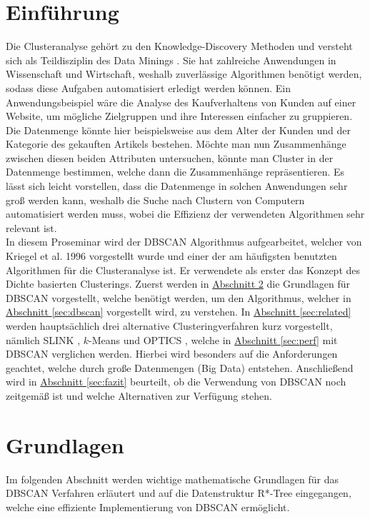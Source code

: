 \documentclass{lni}
\begin{document}
\section{Einführung}
Die Clusteranalyse gehört zu den Knowledge-Discovery Methoden und versteht sich als Teildisziplin des Data Minings \cite{BIGDATA}. Sie hat zahlreiche Anwendungen in Wissenschaft und Wirtschaft, weshalb zuverlässige Algorithmen benötigt werden, sodass diese Aufgaben automatisiert erledigt werden können. Ein Anwendungsbeispiel wäre die Analyse des Kaufverhaltens von Kunden auf einer Website, um mögliche Zielgruppen und ihre Interessen einfacher zu gruppieren. Die Datenmenge könnte hier beispielsweise aus dem Alter der Kunden und der Kategorie des gekauften Artikels bestehen. Möchte man nun Zusammenhänge zwischen diesen beiden Attributen untersuchen, könnte man Cluster in der Datenmenge bestimmen, welche dann die Zusammenhänge repräsentieren. Es lässt sich leicht vorstellen, dass die Datenmenge in solchen Anwendungen sehr groß werden kann, weshalb die Suche nach Clustern von Computern automatisiert werden muss, wobei die Effizienz der verwendeten Algorithmen sehr relevant ist.\\
In diesem Proseminar wird der DBSCAN \cite{DBSCAN} Algorithmus aufgearbeitet, welcher von Kriegel et al. 1996 vorgestellt wurde und einer der am häufigsten benutzten Algorithmen für die Clusteranalyse ist. Er verwendete als erster das Konzept des Dichte basierten Clusterings. Zuerst werden in \hyperref[sec:grund]{Abschnitt \ref{sec:grund}} die Grundlagen für DBSCAN vorgestellt, welche benötigt werden, um den Algorithmus, welcher in \hyperref[sec:dbscan]{Abschnitt \ref{sec:dbscan}} vorgestellt wird, zu verstehen. In \hyperref[sec:related]{Abschnitt \ref{sec:related}} werden hauptsächlich drei alternative Clusteringverfahren kurz vorgestellt, nämlich SLINK \cite{HIER}, $k$-Means \cite{TOP10} und OPTICS \cite{OPTICS}, welche in \hyperref[sec:perf]{Abschnitt \ref{sec:perf}} mit DBSCAN verglichen werden. Hierbei wird besonders auf die Anforderungen geachtet, welche durch große Datenmengen (Big Data) \cite{BIGDATA} entstehen. Anschließend wird in \hyperref[sec:fazit]{Abschnitt \ref{sec:fazit}} beurteilt, ob die Verwendung von DBSCAN noch zeitgemäß ist und welche Alternativen zur Verfügung stehen.

%
%

\section{Grundlagen}
\label{sec:grund}
Im folgenden Abschnitt werden wichtige mathematische Grundlagen für das DBSCAN Verfahren erläutert und auf die Datenstruktur R*-Tree \cite{R*} eingegangen, welche eine effiziente Implementierung von DBSCAN ermöglicht.
\end{document}
